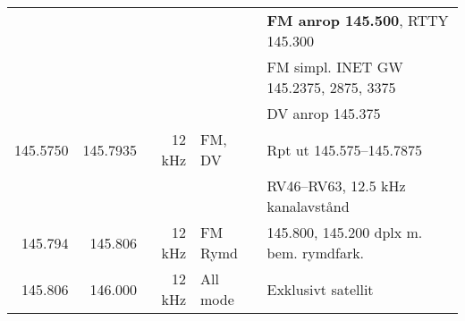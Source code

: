 {{\begin{tabular}{rrrll}
         &           &         &              & \textbf{FM anrop 145.500}, RTTY 145.300 \\
         &           &         &              & FM simpl. INET GW 145.2375, 2875, 3375  \\
         &           &         &              & DV anrop 145.375                        \\ \hline
145.5750 & 145.7935  & 12 kHz  & FM, DV       & Rpt ut 145.575--145.7875                \\
         &           &         &              & RV46–RV63, 12.5 kHz kanalavstånd        \\ \hline
145.794  & 145.806   & 12 kHz  & FM Rymd      & 145.800, 145.200 dplx m. bem. rymdfark. \\ \hline
145.806  & 146.000   & 12 kHz  & All mode     & Exklusivt satellit                      \\ \hline
\end{tabular}}

}
